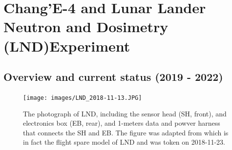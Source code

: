 \section{Chang'E-4 and Lunar Lander Neutron and Dosimetry (LND)Experiment}
\label{sec:change_4_LND}

\subsection{Overview and current status (2019 - 2022)}

\begin{figure}
    \centering
    \texttt{[image: images/LND\_2018-11-13.JPG]}
    \caption[Photograph of \ac{LND}]{The photograph of \ac{LND}, including the sensor head (SH, front), and electronics box (EB, rear), and 1-meters data and powver harness that connects the SH and EB. The figure was adapted from \citet{Wimmer2020SSRv} which is in fact the flight spare model of LND and was token on 2018-11-23.}
    \label{Fig:LND_instrument}
\end{figure}


